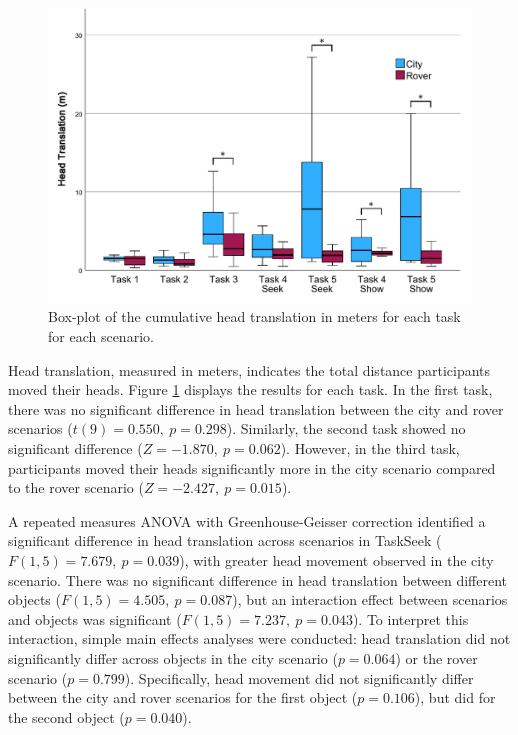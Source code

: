             \begin{figure}[h!]
                \centering
                \includegraphics[width=1\linewidth]{figures/head_graph.pdf}
                \caption{Box-plot of the cumulative head translation in meters for each task for each scenario.}
                \label{fig:task_time}
            \end{figure}

            Head translation, measured in meters, indicates the total distance participants moved their heads. Figure \ref{fig:task_time} displays the results for each task. In the first task, there was no significant difference in head translation between the city and rover scenarios ($t(9) = 0.550,\ p = 0.298$). Similarly, the second task showed no significant difference ($Z = -1.870,\ p = 0.062$). However, in the third task, participants moved their heads significantly more in the city scenario compared to the rover scenario ($Z = -2.427,\ p = 0.015$).

            A repeated measures ANOVA with Greenhouse-Geisser correction identified a significant difference in head translation across scenarios in TaskSeek ($F(1, 5) = 7.679,\ p = 0.039$), with greater head movement observed in the city scenario. There was no significant difference in head translation between different objects ($F(1, 5) = 4.505,\ p = 0.087$), but an interaction effect between scenarios and objects was significant ($F(1, 5) = 7.237,\ p = 0.043$). To interpret this interaction, simple main effects analyses were conducted: head translation did not significantly differ across objects in the city scenario ($p = 0.064$) or the rover scenario ($p = 0.799$). Specifically, head movement did not significantly differ between the city and rover scenarios for the first object ($p = 0.106$), but did for the second object ($p = 0.040$).

